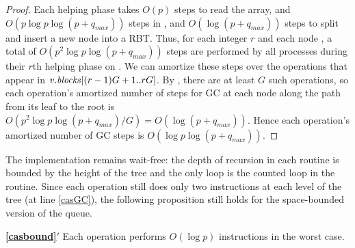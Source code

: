 \begin{proof}
Each helping phase takes $O(p)$ steps to read the  array, and
$O(p \log p \log(p+q_{max}))$ steps in ,
and $O(\log(p+q_{max}))$ steps to split and insert a new node into a RBT.
Thus, for each integer $r$ and each node , a total of $O(p^2\log p\log(p+q_{max}))$ steps
are performed by all processes during their $r$th helping phase on .
We can amortize these steps over the operations that appear in 
$\mbox{\textnormal{\textit{v}}}.\mbox{\textit{blocks}}[(r-1)G+1..rG]$.
By , there are at least $G$ such operations, 
so each operation's amortized number of steps for GC at each node along the path from its leaf to the root
is $O(p^2\log p\log(p+q_{max})/G)=O(\log(p+q_{max}))$.
Hence each operation's amortized number of GC steps is $O(\log p\log(p+q_{max}))$.
\end{proof}

The implementation remains wait-free:  the depth of recursion in each routine is  bounded
by the height of the tree and the only loop is the counted loop in the  routine.
Since each operation still  does only two  instructions at each level of the tree (at line \ref{casGC}), the following proposition still holds for the space-bounded version of the queue.

\begin{customprop}{\textbf{\ref{casbound}}$'$}
Each operation performs $O(\log p)$  instructions in the worst case.
\end{customprop}
